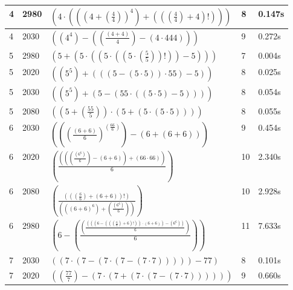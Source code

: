 \documentclass{article}
\theoremstyle{nonumberplain}
\begin{document}
\begin{center}
\begin{longtable}{ | l | l | p{9.5cm} | l | l | }
            4 & 2980 & \( \left(4 \cdot \left(\left({\left(4 + \left(\frac{4}{4}\right)\right)}^{4}\right) + \left(\left(\left(\frac{4}{4}\right) + 4\right)!\right)\right)\right) \) & 8 & 0.147s \\\hline
            4 & 2030 & \( \left(\left({4}^{4}\right) - \left(\left(\frac{\left(4 + 4\right)}{4}\right) - \left(4 \cdot 444\right)\right)\right) \) & 9 & 0.272s \\\hline
            5 & 2980 & \( \left(5 + \left(5 \cdot \left(\left(5 \cdot \left(\left(5 \cdot \left(\frac{5}{5}\right)\right)!\right)\right) - 5\right)\right)\right) \) & 7 & 0.004s \\\hline
            5 & 2020 & \( \left(\left({5}^{5}\right) + \left(\left(\left(5 - \left(5 \cdot 5\right)\right) \cdot 55\right) - 5\right)\right) \) & 8 & 0.025s \\\hline
            5 & 2030 & \( \left(\left({5}^{5}\right) + \left(5 - \left(55 \cdot \left(\left(5 \cdot 5\right) - 5\right)\right)\right)\right) \) & 8 & 0.054s \\\hline
            5 & 2080 & \( \left(\left(5 + \left(\frac{55}{5}\right)\right) \cdot \left(5 + \left(5 \cdot \left(5 \cdot 5\right)\right)\right)\right) \) & 8 & 0.055s \\\hline
            6 & 2030 & \( \left(\left({\left(\frac{\left(6 + 6\right)}{6}\right)}^{\left(\frac{66}{6}\right)}\right) - \left(6 + \left(6 + 6\right)\right)\right) \) & 9 & 0.454s \\\hline
            6 & 2020 & \( \left(\frac{\left(\left(\left(\frac{\left({6}^{6}\right)}{6}\right) - \left(6 + 6\right)\right) + \left(66 \cdot 66\right)\right)}{6}\right) \) & 10 & 2.340s \\\hline
            6 & 2080 & \( \left(\frac{\left(\left(\left(\frac{6}{6}\right) + \left(6 + 6\right)\right)!\right)}{\left(\left({\left(6 + 6\right)}^{6}\right) + \left(\frac{\left({6}^{6}\right)}{6}\right)\right)}\right) \) & 10 & 2.928s \\\hline
            6 & 2980 & \( \left(6 - \left(\frac{\left(\frac{\left(\left(\left(6 - \left(\left(\left(\frac{6}{6}\right) + 6\right)!\right)\right) \cdot \left(6 + 6\right)\right) - \left({6}^{6}\right)\right)}{6}\right)}{6}\right)\right) \) & 11 & 7.633s \\\hline
            7 & 2030 & \( \left(\left(7 \cdot \left(7 - \left(7 \cdot \left(7 - \left(7 \cdot 7\right)\right)\right)\right)\right) - 77\right) \) & 8 & 0.101s \\\hline
            7 & 2020 & \( \left(\left(\frac{77}{7}\right) - \left(7 \cdot \left(7 + \left(7 \cdot \left(7 - \left(7 \cdot 7\right)\right)\right)\right)\right)\right) \) & 9 & 0.660s \\\hline

\end{longtable}
\end{center}
\end{document}
